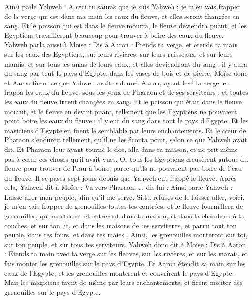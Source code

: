 \begin{multicols}{2}
Ainsi parle Yahweh : A ceci tu sauras que je suis Yahweh ; je m'en vais frapper de la verge qui est dans ma main les eaux du fleuve, et elles seront changées en sang.
Et le poisson qui est dans le fleuve mourra, le fleuve deviendra puant, et les Egyptiens travailleront beaucoup pour trouver à boire des eaux du fleuve.
Yahweh parla aussi à Moïse : Dis à Aaron : Prends ta verge, et étends ta main sur les eaux des Egyptiens, sur leurs rivières, sur leurs ruisseaux, et sur leurs marais, et sur tous les amas de leurs eaux, et elles deviendront du sang ; il y aura du sang par tout le pays d'Egypte, dans les vases de bois et de pierre.
Moïse donc et Aaron firent ce que Yahweh avait ordonné. Aaron, ayant levé la verge, en frappa les eaux du fleuve, sous les yeux de Pharaon et de ses serviteurs ; et toutes les eaux du fleuve furent changées en sang.
Et le poisson qui était dans le fleuve mourut, et le fleuve en devint puant, tellement que les Egyptiens ne pouvaient point boire les eaux du fleuve ; il y eut du sang dans tout le pays d'Egypte.
Et les magiciens d'Egypte en firent le semblable par leurs enchantements. Et le cœur de Pharaon s'endurcit tellement, qu'il ne les écouta point, selon ce que Yahweh avait dit.
Et Pharaon leur ayant tourné le dos, alla dans sa maison, et ne prit même pas à cœur ces choses qu'il avait vues.
Or tous les Egyptiens creusèrent autour du fleuve pour trouver de l'eau à boire, parce qu'ils ne pouvaient pas boire de l'eau du fleuve.
Il se passa sept jours depuis que Yahweh eut frappé le fleuve.
Après cela, Yahweh dit à Moïse : Va vers Pharaon, et dis-lui : Ainsi parle Yahweh : Laisse aller mon peuple, afin qu'il me serve.
Si tu refuses de le laisser aller, voici, je m'en vais frapper de grenouilles toutes tes contrées;
et le fleuve fourmillera de grenouilles, qui monteront et entreront dans ta maison, et dans la chambre où tu couches, et sur ton lit, et dans les maisons de tes serviteurs, et parmi tout ton peuple, dans tes fours, et dans tes maies .
Ainsi, les grenouilles monteront sur toi, sur ton peuple, et sur tous tes serviteurs.
\VerseOne{}Yahweh donc dit à Moïse : Dis à Aaron : Etends ta main avec ta verge sur les fleuves, sur les rivières, et sur les marais, et fais monter les grenouilles sur le pays d'Egypte.
Et Aaron étendit sa main sur les eaux de l'Egypte, et les grenouilles montèrent et couvrirent le pays d'Egypte.
Mais les magiciens firent de même par leurs enchantements, et firent monter des grenouilles sur le pays d'Egypte.

\end{multicols}
